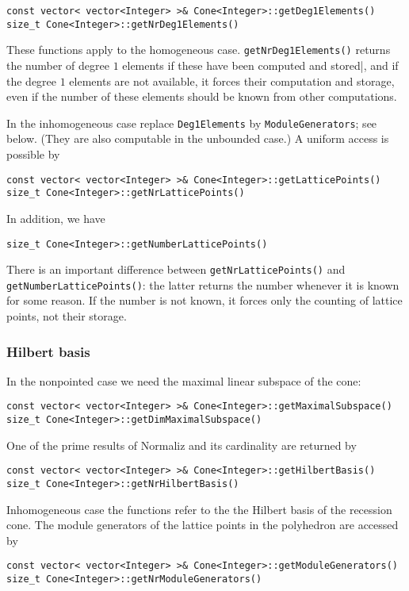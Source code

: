 \documentclass[12pt,a4paper]{scrartcl}
\theoremstyle{definition}
\begin{document}
\begin{small}
\begin{Verbatim}
const vector< vector<Integer> >& Cone<Integer>::getDeg1Elements()
size_t Cone<Integer>::getNrDeg1Elements()
\end{Verbatim}
These functions apply to the homogeneous case. \verb|getNrDeg1Elements()| returns the number of degree $1$ elements if these have been computed and stored|, and if the degree $1$ elements are not available, it forces their computation and storage, even if the number of these elements should be known from other computations.

In the inhomogeneous case replace \verb|Deg1Elements| by \verb|ModuleGenerators|;  see below. (They are also computable in the unbounded case.)  A uniform access is possible by
\begin{Verbatim}
const vector< vector<Integer> >& Cone<Integer>::getLatticePoints()
size_t Cone<Integer>::getNrLatticePoints()
\end{Verbatim} 

In addition, we have
\begin{Verbatim} 
size_t Cone<Integer>::getNumberLatticePoints()
\end{Verbatim} 
There is an important difference between \verb|getNrLatticePoints()| and \verb|getNumberLatticePoints()|: the latter  returns the number whenever it is known for some reason. If the number is not known, it forces only the counting of lattice points, not their storage.

\subsubsection{Hilbert basis}\label{HB_lib}

In the nonpointed case we need the maximal linear subspace of the cone:
\begin{Verbatim}
const vector< vector<Integer> >& Cone<Integer>::getMaximalSubspace()
size_t Cone<Integer>::getDimMaximalSubspace()
\end{Verbatim}

One of the prime results of Normaliz and its cardinality are returned by
\begin{Verbatim}
const vector< vector<Integer> >& Cone<Integer>::getHilbertBasis()
size_t Cone<Integer>::getNrHilbertBasis()
\end{Verbatim}
Inhomogeneous case the functions refer to the the Hilbert basis of the recession cone. The module generators of the lattice points in the polyhedron are accessed by
\begin{Verbatim}
const vector< vector<Integer> >& Cone<Integer>::getModuleGenerators()
size_t Cone<Integer>::getNrModuleGenerators()
\end{Verbatim}


\end{small}
\end{document}
